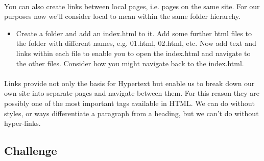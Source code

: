 \documentclass[10pt, a4paper, twosize]{article}
\begin{document}
\paragraph{} You can also create links between local pages, i.e. pages on the same site. For our purposes now we'll consider local to mean within the same folder hierarchy. 
\begin{itemize}
\item Create a folder and add an index.html to it. Add some further html files to the folder with different names, e.g. 01.html, 02.html, etc. Now add text and links within each file to enable you to open the index.html and navigate to the other files. Consider how you might navigate back to the index.html. 
\end{itemize}





\paragraph{} Links provide not only the basis for Hypertext but enable us to break down our own site into separate pages and navigate between them. For this reason they are possibly one of the most important tags available in HTML. We can do without styles, or ways differentiate a paragraph from a heading, but we can't do without hyper-links.

\subsection{Challenge}
\end{document}
